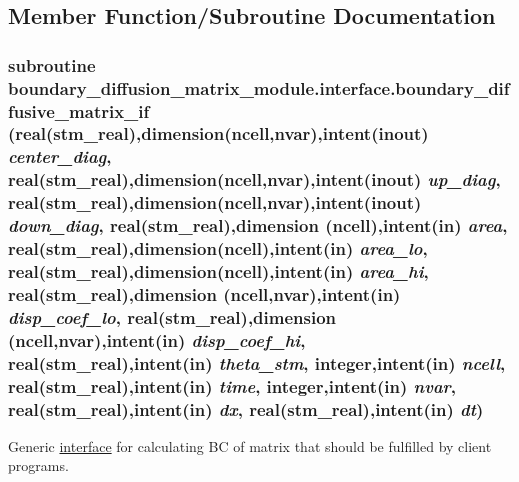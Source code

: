 \subsection{Member Function/Subroutine Documentation}
\hypertarget{a00003_264875de0ad3240178f5d579d8542776}{
\subsubsection[{boundary\_\-diffusive\_\-matrix\_\-if}]{\setlength{\rightskip}{0pt plus 5cm}subroutine boundary\_\-diffusion\_\-matrix\_\-module.interface.boundary\_\-diffusive\_\-matrix\_\-if (real(stm\_\-real),dimension(ncell,nvar),intent(inout) {\em center\_\-diag}, \/  real(stm\_\-real),dimension(ncell,nvar),intent(inout) {\em up\_\-diag}, \/  real(stm\_\-real),dimension(ncell,nvar),intent(inout) {\em down\_\-diag}, \/  real(stm\_\-real),dimension (ncell),intent(in) {\em area}, \/  real(stm\_\-real),dimension(ncell),intent(in) {\em area\_\-lo}, \/  real(stm\_\-real),dimension(ncell),intent(in) {\em area\_\-hi}, \/  real(stm\_\-real),dimension (ncell,nvar),intent(in) {\em disp\_\-coef\_\-lo}, \/  real(stm\_\-real),dimension (ncell,nvar),intent(in) {\em disp\_\-coef\_\-hi}, \/  real(stm\_\-real),intent(in) {\em theta\_\-stm}, \/  integer,intent(in) {\em ncell}, \/  real(stm\_\-real),intent(in) {\em time}, \/  integer,intent(in) {\em nvar}, \/  real(stm\_\-real),intent(in) {\em dx}, \/  real(stm\_\-real),intent(in) {\em dt})}}
\label{a00003_264875de0ad3240178f5d579d8542776}


Generic \hyperlink{a00003}{interface} for calculating BC of matrix that should be fulfilled by client programs. 

